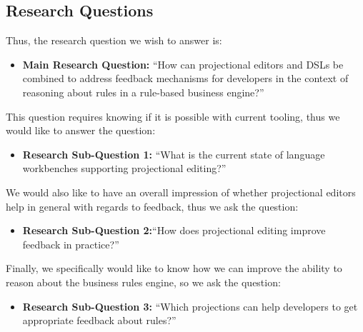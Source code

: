 \subsection{Research Questions}

Thus, the research question we wish to answer is:
\begin{itemize}
    \item \textbf{Main Research Question:} ``How can projectional editors and DSLs be combined to address feedback mechanisms for developers in the context of reasoning about rules in a rule-based business engine?''
\end{itemize}

This question requires knowing if it is possible with current tooling, thus we would like to answer the question:
\begin{itemize}
    \item \textbf{Research Sub-Question 1:} ``What is the current state of language workbenches supporting projectional editing?''
\end{itemize}

We would also like to have an overall impression of whether projectional editors help in general with regards to feedback, thus we ask the question:
\begin{itemize}
    \item \textbf{Research Sub-Question 2:}``How does projectional editing improve feedback in practice?''
\end{itemize}

Finally, we specifically would like to know how we can improve the ability to reason about the business rules engine, so we ask the question:
\begin{itemize}
    \item \textbf{Research Sub-Question 3:} ``Which projections can help developers to get appropriate feedback about rules?''
\end{itemize}


